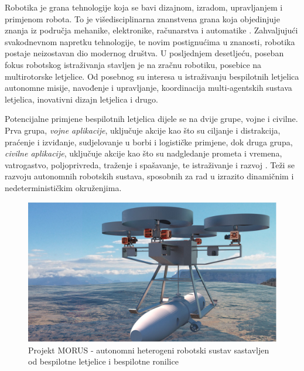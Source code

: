 \documentclass[11pt,a4paper]{article}
\begin{document}
Robotika je grana tehnologije koja se bavi dizajnom, izradom, upravljanjem i primjenom robota. To je višedisciplinarna znanstvena grana koja objedinjuje znanja iz područja mehanike, elektronike, računarstva i automatike \cite{kova}. Zahvaljujući svakodnevnom napretku tehnologije, te novim postignućima u znanosti, robotika postaje neizostavan dio modernog društva. U posljednjem desetljeću, poseban fokus robotskog istraživanja stavljen je na zračnu robotiku, posebice na multirotorske letjelice. Od posebnog su interesa u istraživanju bespilotnih letjelica autonomne misije, navođenje i upravljanje, koordinacija multi-agentskih sustava letjelica, inovativni dizajn letjelica i drugo. 

\medskip

Potencijalne primjene bespilotnih letjelica dijele se na dvije grupe, vojne i civilne. Prva grupa, \textit{vojne aplikacije}, uključuje akcije kao što su ciljanje i distrakcija, praćenje i izviđanje, sudjelovanje u borbi i logističke primjene, dok druga grupa, \textit{civilne aplikacije}, uključuje akcije kao što su nadgledanje prometa i vremena, vatrogastvo, poljoprivreda, traženje i spašavanje, te istraživanje i razvoj \cite{urs}. Teži se razvoju autonomnih robotskih sustava, sposobnih za rad u izrazito dinamičnim i nedeterminističkim okruženjima.

\medskip

\begin{figure}[H]
	\centering
	\includegraphics[scale=0.35]{koord}
	\caption{Projekt MORUS - autonomni heterogeni robotski sustav sastavljen od bespilotne letjelice i bespilotne ronilice \cite{haus2}}
	\label{fig:koord}
\end{figure}
\end{document}
